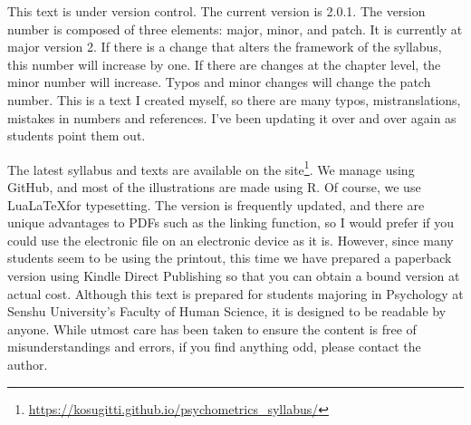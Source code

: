 This text is under version control. The current version is 2.0.1. The version number is composed of three elements: major, minor, and patch.
It is currently at major version 2. If there is a change that alters the framework of the syllabus, this number will increase by one. If there are changes at the chapter level, the minor number will increase.
Typos and minor changes will change the patch number. This is a text I created myself, so there are many typos, mistranslations, mistakes in numbers and references. I've been updating it over and over again as students point them out.

The latest syllabus and texts are available on the site\footnote{\url{https://kosugitti.github.io/psychometrics_syllabus/}}.
We manage using GitHub, and most of the illustrations are made using R. Of course, we use Lua\LaTeX for typesetting.
The version is frequently updated, and there are unique advantages to PDFs such as the linking function, so I would prefer if you could use the electronic file on an electronic device as it is.
However, since many students seem to be using the printout, this time we have prepared a paperback version using Kindle Direct Publishing so that you can obtain a bound version at actual cost.
Although this text is prepared for students majoring in Psychology at Senshu University's Faculty of Human Science, it is designed to be readable by anyone. While utmost care has been taken to ensure the content is free of misunderstandings and errors, if you find anything odd, please contact the author.


